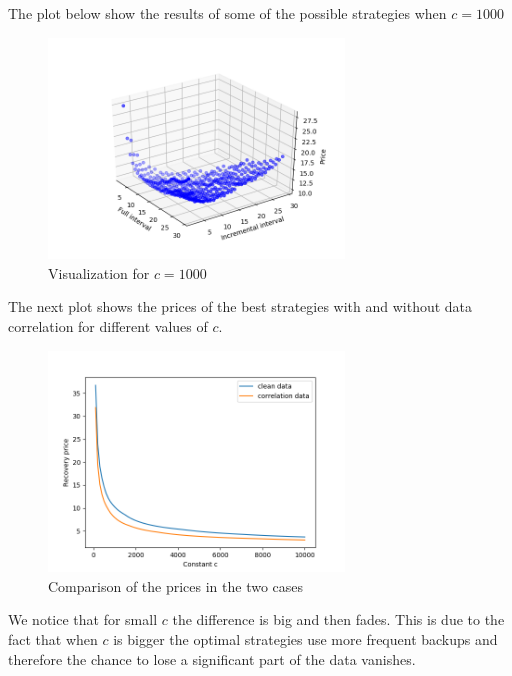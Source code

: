 \documentclass[11pt, a4paper]{article}
\theoremstyle{definition}
\begin{document}
The plot below show the results of some of the possible strategies when $c = 1000$
\begin{figure}[H]
	\begin{minipage}{1.0\textwidth}
		\centering
		\includegraphics[width=0.7\textwidth]{3d_all_1.png}
		\caption{Visualization for $c=1000$}\label{Fig:Whole_model}
	\end{minipage}
\end{figure}
The next plot shows the prices of the best strategies with and without data correlation for different values of $c$.
\begin{figure}[H]
	\begin{minipage}{1.0\textwidth}
		\centering
		\includegraphics[width=0.7\textwidth]{correlation_vs_clean.png}
		\caption{Comparison of the prices in the two cases}\label{Fig:Corr_vs_clean}
	\end{minipage}
\end{figure}
We notice that for small $c$ the difference is big and then fades. This is due to the fact that when $c$ is bigger the optimal strategies use more frequent backups and therefore the chance to lose a significant part of the data vanishes.
\newpage	
\end{document}

